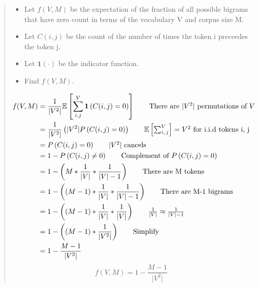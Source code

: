 \begin{quote}
    \begin{itemize}
	\item Let $f(V, M)$ be the expectation of the fraction of all possible bigrams that have zero count in terms of the vocabulary V and corpus size M.
	\item Let $C(i, j)$ be the count of the number of times the token i preceedes the token j. 
	\item Let $\mathbf{1}(\cdot)$ be the indicator function. 
	\item Find $f(V, M)$.
    \end{itemize}
    \begin{align*}
	f(V, M) &= \frac{1}{\lvert V^2 \rvert} \mathbb{E} \left[ \sum_{i, j}^V \mathbf{1} \left(C(i, j) = 0 \right) \right] \tag*{There are $\lvert V^2 \rvert$ permutations of $V$} \\
    	    &= \frac{1}{\lvert V^2 \rvert} \left( \lvert V^2 \rvert P\left(C(i, j) = 0\right) \right) \tag*{$\mathbb{E}\left[ \sum_{i,\,j}^V \right] = V^2$ for i.i.d tokens i, j}\\
	    &= P \left( C(i, j) = 0 \right) \tag*{$\lvert V^2 \rvert$ cancels} \\
	    &= 1 - P \left(C(i, j) \neq 0 \right) \tag*{Complement of $P \left( C(i, j) = 0 \right)$} \\
	    &= 1 - \left( M * \frac{1}{\lvert V \rvert} * \frac{1}{\lvert V \rvert - 1} \right) \tag*{There are M tokens} \\
	    &= 1 - \left( (M - 1) * \frac{1}{\lvert V \rvert} * \frac{1}{\lvert V \rvert - 1} \right) \tag*{There are M-1 bigrams} \\
	    &= 1 - \left( (M - 1) * \frac{1}{\lvert V \rvert} * \frac{1}{\lvert V \rvert } \right) \tag*{$\frac{1}{\lvert V \rvert} \approx \frac{1}{\lvert V \rvert - 1}$} \\
	    &= 1 - \left( (M - 1) * \frac{1}{\lvert V^2 \rvert}  \right) \tag*{Simplify} \\
	    &= 1 - \frac{M - 1}{\lvert V^2 \rvert}
    \end{align*}
    $$ \boxed{ f(V, M) = 1 - \frac{M - 1}{\lvert V^2 \rvert} } $$
\end{quote}
